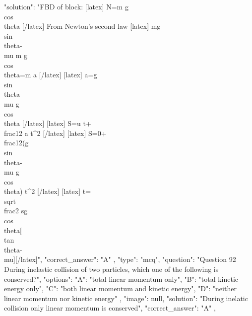 {    "solution": "FBD of block: [latex] N=m g \\cos \\theta [/latex] From Newton's second law [latex] mg \\sin \\theta-\\mu m g \\cos \\theta=m a [/latex] [latex] a=g \\sin \\theta-\\mu g \\cos \\theta [/latex] [latex] S=u t+\\frac{1}{2} a t^{2} [/latex] [latex] S=0+\\frac{1}{2}(g \\sin \\theta-\\mu g \\cos \\theta) t^{2} [/latex] [latex] t=\\sqrt{\\frac{2 s}{g \\cos \\theta[\\tan \\theta-\\mu]}}[/latex]",
    "correct_answer": "A"
  },
  {
    "type": "mcq",
    "question": "Question 92 During inelastic collision of two particles, which one of the following is conserved?",
    "options": {
      "A": "total linear momentum only",
      "B": "total kinetic energy only",
      "C": "both linear momentum and kinetic energy",
      "D": "neither linear momentum nor kinetic energy"
    },
    "image": null,
    "solution": "During inelatic collision only linear momentum is conserved",
    "correct_answer": "A"
  },

